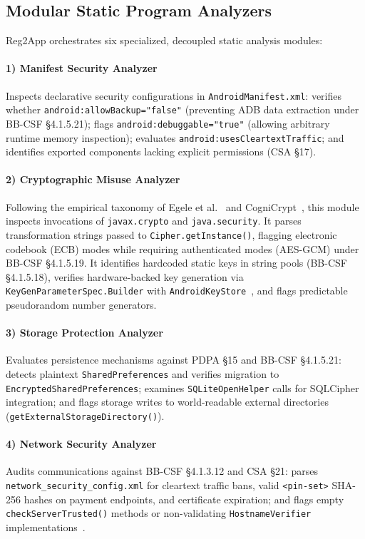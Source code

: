 \subsection{Modular Static Program Analyzers}
\label{sec:engine:analyzers}

Reg2App orchestrates six specialized, decoupled static analysis modules:

\paragraph{1) Manifest Security Analyzer} Inspects declarative security configurations in \texttt{AndroidManifest.xml}: verifies whether \texttt{android:allowBackup="false"} (preventing ADB data extraction under BB-CSF §4.1.5.21); flags \texttt{android:debuggable="true"} (allowing arbitrary runtime memory inspection); evaluates \texttt{android:usesCleartextTraffic}; and identifies exported components lacking explicit permissions (CSA §17).

\paragraph{2) Cryptographic Misuse Analyzer} Following the empirical taxonomy of Egele et al.~\cite{crypto_misuse_ccs} and CogniCrypt~\cite{cognicrypt}, this module inspects invocations of \texttt{javax.crypto} and \texttt{java.security}. It parses transformation strings passed to \texttt{Cipher.getInstance()}, flagging electronic codebook (ECB) modes while requiring authenticated modes (AES-GCM) under BB-CSF §4.1.5.19. It identifies hardcoded static keys in string pools (BB-CSF §4.1.5.18), verifies hardware-backed key generation via \texttt{KeyGenParameterSpec.Builder} with \texttt{AndroidKeyStore}~\cite{ekberg_tee}, and flags predictable pseudorandom number generators.

\paragraph{3) Storage Protection Analyzer} Evaluates persistence mechanisms against PDPA §15 and BB-CSF §4.1.5.21: detects plaintext \texttt{SharedPreferences} and verifies migration to \texttt{EncryptedSharedPreferences}; examines \texttt{SQLiteOpenHelper} calls for SQLCipher integration; and flags storage writes to world-readable external directories (\texttt{getExternalStorageDirectory()}).

\paragraph{4) Network Security Analyzer} Audits communications against BB-CSF §4.1.3.12 and CSA §21: parses \texttt{network\_security\_config.xml} for cleartext traffic bans, valid \texttt{\textless{}pin-set\textgreater{}} SHA-256 hashes on payment endpoints, and certificate expiration; and flags empty \texttt{checkServerTrusted()} methods or non-validating \texttt{HostnameVerifier} implementations~\cite{fahl_msc, castle_crypto}.

